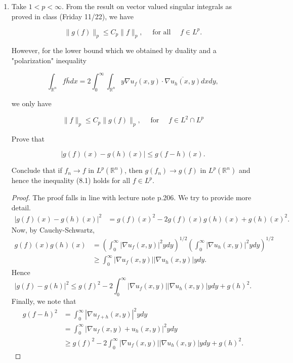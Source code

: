 \begin{enumerate}
\item 
	Take $1<p<\infty$. From the result on vector valued singular integrals as proved in class (Friday 11/22), we have

\[
\|g(f)\|_p \leq C_p\|f\|_p, \quad \text { for all } \quad f \in L^p .
\]


However, for the lower bound which we obtained by duality and a "polarization" inequality

\[
\int_{\mathbb{R}^n} f \bar{h} d x=2 \int_0^{\infty} \int_{\mathbb{R}^n} y \nabla u_f(x, y) \cdot \overline{\nabla u_h(x, y)} d x d y,
\]

we only have

\[
\|f\|_p \leq C_p\|g(f)\|_p, \quad \text { for } \quad f \in L^2 \cap L^p
\]


Prove that

\[
|g(f)(x)-g(h)(x)| \leq g(f-h)(x) .
\]


Conclude that if $f_n \rightarrow f$ in $L^p\left(\mathbb{R}^n\right)$, then $g\left(f_n\right) \rightarrow g(f)$ in $L^p\left(\mathbb{R}^n\right)$ and hence the inequality (8.1) holds for all $f \in L^p$.

\begin{proof}
	The proof falls in line with lecture note p.206. We try to provide more detail.
	\begin{align*}
		|g(f)(x) - g(h)(x)|^2
		&= g(f)(x)^2 - 2 g(f)(x) g(h)(x) + g(h)(x)^2 
	.\end{align*}
	Now, by Cauchy-Schwartz,
	\begin{align*}
		g(f)(x) g(h)(x)
		&= \left( \int _0^\infty \left| \nabla u_f(x,y) \right| ^2 y dy  \right) ^{1 / 2} \left( \int _0^\infty \left| \nabla u_h(x,y) \right| ^2 y dy  \right) ^{1 / 2}\\
		&\ge  \int _0^\infty \left| \nabla u_f(x,y) \right|\left| \nabla u_h(x,y) \right|  y dy
	.\end{align*}
	Hence
	\[
		|g(f) - g(h)|^2
		\le g(f)^2 - 2 \int _0^\infty \left| \nabla u_f(x,y) \right|\left| \nabla u_h(x,y) \right|  y dy + g(h)^2
	.\] 
	Finally, we note that
	\begin{align*}
		g(f - h)^2
		&= \int _0^\infty \left| \nabla u_{f + h}(x, y) \right| ^2 y dy \\
		&= \int _0^\infty \left| \nabla u_{f}(x, y) + u_h(x,y) \right| ^2 y dy \\
		&\ge g(f)^2 - 2 \int _0^\infty \left| \nabla u_f(x,y) \right|\left| \nabla u_h(x,y) \right|  y dy + g(h)^2
	.\end{align*}
\end{proof}





\end{enumerate}
